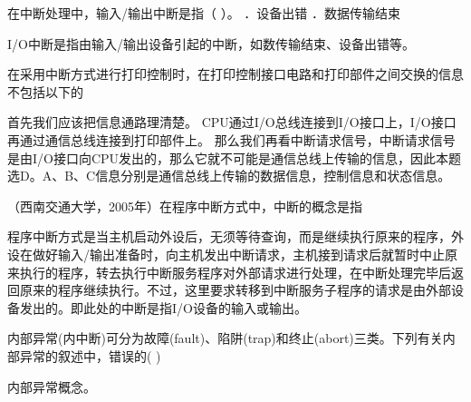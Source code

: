 \question 在中断处理中，输入/输出中断是指（ ）。 ．设备出错 ．数据传输结束
\par{}
\begin{solution}I/O中断是指由输入/输出设备引起的中断，如数传输结束、设备出错等。
\end{solution}
\question 在采用中断方式进行打印控制时，在打印控制接口电路和打印部件之间交换的信息不包括以下的
\par{}
\begin{solution}首先我们应该把信息通路理清楚。
CPU通过I/O总线连接到I/O接口上，I/O接口再通过通信总线连接到打印部件上。
那么我们再看中断请求信号，中断请求信号是由I/O接口向CPU发出的，那么它就不可能是通信总线上传输的信息，因此本题选D。A、B、C信息分别是通信总线上传输的数据信息，控制信息和状态信息。
\end{solution}
\question （西南交通大学，2005年）在程序中断方式中，中断的概念是指
\par{}
\begin{solution}程序中断方式是当主机启动外设后，无须等待查询，而是继续执行原来的程序，外设在做好输入/输出准备时，向主机发出中断请求，主机接到请求后就暂时中止原来执行的程序，转去执行中断服务程序对外部请求进行处理，在中断处理完毕后返回原来的程序继续执行。不过，这里要求转移到中断服务子程序的请求是由外部设备发出的。即此处的中断是指I/O设备的输入或输出。
\end{solution}
\question 内部异常(内中断)可分为故障(fault)、陷阱(trap)和终止(abort)三类。下列有关内部异常的叙述中，错误的(
)
\par{}
\begin{solution}内部异常概念。
\end{solution}
